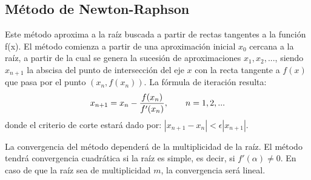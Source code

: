 \documentclass[11pt]{article}
\begin{document}
\subsection*{M\'etodo de Newton-Raphson}

Este m\'etodo aproxima a la ra\'iz buscada a partir de rectas tangentes a la funci\'on f(x). El m\'etodo comienza a partir de una aproximaci\'on inicial $x_{0}$ cercana a la ra\'iz, a partir de la cual se genera la sucesi\'on de aproximaciones $x_{1}, x_{2}, ...$, siendo $x_{n+1}$ la abscisa del punto de intersecci\'on del eje $x$ con la recta tangente a $f(x)$ que pasa por el punto $(x_{n}, f(x_{n}))$. La f\'ormula de iteraci\'on resulta:
\begin{equation*}
\centering
x_{n+1} = x_{n} -\frac{f(x_{n})}{f'(x_{n})}, \qquad  n= 1, 2, ...
\end{equation*} 
donde el criterio de corte estar\'a dado por: $|x_{n+1} - x_{n}| < \epsilon|x_{n+1}|$.\par
La convergencia del m\'etodo depender\'a de la multiplicidad de la ra\'iz. El m\'etodo tendr\'a convergencia cuadr\'atica si la ra\'iz es simple, es decir, si $f'(\alpha) \neq 0$. En caso de que la ra\'iz sea de multiplicidad $m$, la convergencia ser\'a lineal.
\end{document}
